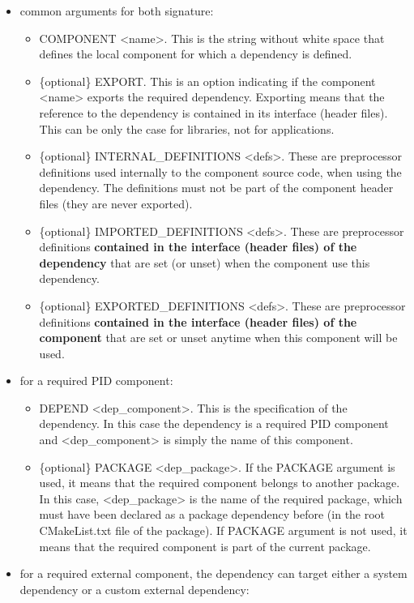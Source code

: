 \documentclass[12pt,a4paper]{article}
\begin{document}
\begin{itemize}
\item common arguments for both signature:
\begin{itemize}
\item COMPONENT <name>. This is the string without white space that defines the local component for which a dependency is defined.
\item \{optional\} EXPORT. This is an option indicating if the component <name> exports the required dependency. Exporting means that the reference to the dependency is contained in its interface (header files). This can be only the case for libraries, not for applications.
\item \{optional\} INTERNAL\_DEFINITIONS <defs>. These are preprocessor definitions used internally to the component source code, when using the dependency. The definitions must not be part of the component header files (they are never exported).
\item \{optional\} IMPORTED\_DEFINITIONS <defs>. These are preprocessor definitions \textbf{contained in the interface (header files) of the dependency} that are set (or unset) when the component use this dependency.
\item \{optional\} EXPORTED\_DEFINITIONS <defs>. These are preprocessor definitions \textbf{contained in the interface (header files) of the component} that are set or unset anytime when this component will be used.
\end{itemize}
\item for a required PID component:
\begin{itemize}
\item DEPEND <dep\_component>. This is the specification of the dependency. In this case the dependency is a required PID component and <dep\_component> is simply the name of this component.
\item \{optional\} PACKAGE <dep\_package>. If the PACKAGE argument is used, it means that the required component belongs to another package. In this case, <dep\_package> is the name of the required package, which must have been declared as a package dependency before (in the root CMakeList.txt file of the package). If PACKAGE argument is not used, it means that the required component is part of the current package.
\end{itemize}
\item for a required external component, the dependency can target either a system dependency or a custom external dependency:
\begin{itemize}

\end{itemize}
\end{itemize}
\end{document}
